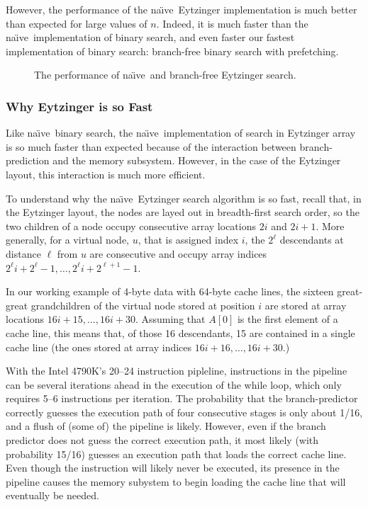 \documentclass{patmorin}
\newcommand{\naive}{na\"{\i}ve}
\begin{document}
However, the performance of the \naive\ Eytzinger implementation is
much better than expected for large values of $n$. Indeed, it is much
faster than the \naive\ implementation of binary search, and even
faster our fastest implementation of binary search: branch-free binary
search with prefetching.

\begin{figure}
   \caption{The performance of \naive\ and branch-free Eytzinger search.}
\end{figure}

\subsubsection{Why Eytzinger is so Fast}

Like \naive\ binary search, the \naive\ implementation of search in
Eytzinger array is so much faster than expected because of the interaction
between branch-prediction and the memory subsystem.  However, in the
case of the Eytzinger layout, this interaction is much more efficient.

To understand why the \naive\ Eytzinger search algorithm is so
fast, recall that, in the Eytzinger layout, the nodes are layed out
in breadth-first search order,  so the two children of a node occupy
consecutive array locations $2i$ and $2i+1$. More generally, for a
virtual node, $u$, that is assigned index $i$, the $2^\ell$ descendants at
distance $\ell$ from $u$ are consecutive and occupy array indices $2^\ell
i + 2^{\ell}-1,\ldots,2^{\ell} i + 2^{\ell+1}-1$.

In our working example of 4-byte data with 64-byte cache lines,
the sixteen great-great grandchildren of the virtual node stored at
position $i$ are stored at array locations $16i+15,\ldots,16i+30$.
Assuming that $A[0]$ is the first element of a cache line, this means
that, of those 16 descendants, 15 are contained in a single cache line
(the ones stored at array indices $16i+16,\ldots,16i+30$.)

With the Intel 4790K's 20--24 instruction pipleline, instructions
in the pipeline can be several iterations ahead in the execution of
the while loop, which only requires 5--6 instructions per iteration.
The probability that the branch-predictor correctly guesses the execution
path of four consecutive stages is only about 1/16, and a flush of (some
of) the pipeline is likely.  However, even if the branch predictor does
not guess the correct execution path, it most likely (with probability
15/16) guesses an execution path that loads the correct cache line.
Even though the instruction will likely never be executed, its presence
in the pipeline causes the memory subystem to begin loading the cache
line that will eventually be needed.
\end{document}
